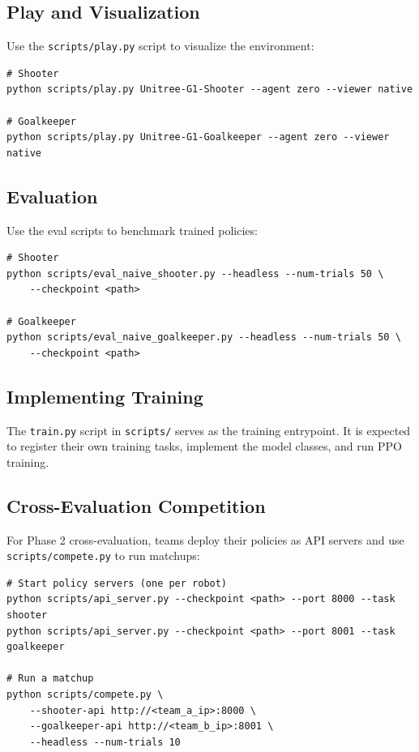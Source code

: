 \documentclass{article}
\begin{document}
\subsection{Play and Visualization}

Use the \texttt{scripts/play.py} script to visualize the environment:

\begin{verbatim}
# Shooter
python scripts/play.py Unitree-G1-Shooter --agent zero --viewer native

# Goalkeeper
python scripts/play.py Unitree-G1-Goalkeeper --agent zero --viewer native
\end{verbatim}

\subsection{Evaluation}

Use the eval scripts to benchmark trained policies:

\begin{verbatim}
# Shooter
python scripts/eval_naive_shooter.py --headless --num-trials 50 \
    --checkpoint <path>

# Goalkeeper
python scripts/eval_naive_goalkeeper.py --headless --num-trials 50 \
    --checkpoint <path>
\end{verbatim}

\subsection{Implementing Training}

The \texttt{train.py} script in \texttt{scripts/} serves as the training entrypoint. It is expected to register their own training tasks, implement the model classes, and run PPO training.

\subsection{Cross-Evaluation Competition}

For Phase 2 cross-evaluation, teams deploy their policies as API servers and use \texttt{scripts/compete.py} to run matchups:

\begin{verbatim}
# Start policy servers (one per robot)
python scripts/api_server.py --checkpoint <path> --port 8000 --task shooter
python scripts/api_server.py --checkpoint <path> --port 8001 --task goalkeeper

# Run a matchup
python scripts/compete.py \
    --shooter-api http://<team_a_ip>:8000 \
    --goalkeeper-api http://<team_b_ip>:8001 \
    --headless --num-trials 10
\end{verbatim}
\end{document}
